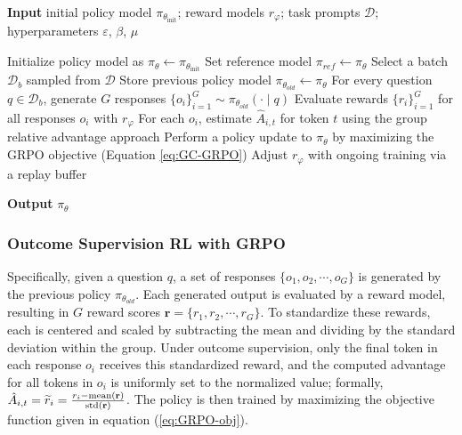 \begin{itemize}[topsep=0pt]
\begin{itemize}[topsep=0pt]
\begin{algorithm}[t]
  \small
  \caption{Iterative Group Relative Policy Optimization}
  \textbf{Input} initial policy model $\pi_{\theta_{\text{init}}}$; reward models $r_\varphi$; task prompts $\mathcal{D}$; 
  hyperparameters $\varepsilon$, $\beta$, $\mu$
  \begin{algorithmic}[1]
    \State Initialize policy model as $\pi_\theta \leftarrow \pi_{\theta_{\text{init}}}$
       \State Set reference model $\pi_{ref} \leftarrow \pi_{\theta}$
      \State Select a batch $\mathcal{D}_b$ sampled from $\mathcal{D}$
      \State Store previous policy model $\pi_{\theta_{old}} \leftarrow \pi_{\theta}$ 
      \State For every question $q \in \mathcal{D}_b$, generate $G$ responses $\{o_i\}_{i=1}^G \sim \pi_{\theta_{old}} (\cdot \mid q)$
      \State Evaluate rewards $\{r_i\}_{i=1}^{G}$ for all responses $o_i$ with $r_\varphi$ 
      \State For each $o_i$, estimate $\hat{A}_{i,t}$ for token $t$ using the group relative advantage approach
        \State Perform a policy update to $\pi_{\theta}$ by maximizing the GRPO objective (Equation \ref{eq:GC-GRPO})
      \EndFor
    \EndFor 
    \State Adjust $r_\varphi$ with ongoing training via a replay buffer
    \EndFor 
  \end{algorithmic}
  \textbf{Output} $\pi_\theta$
  \label{alg:iter-grpo}
\end{algorithm}

\subsubsection{Outcome Supervision RL with GRPO} Specifically, given a question $q$, a set of responses $\{o_1, o_2, \cdots, o_G\}$ is generated by the previous policy $\pi_{\theta_{old}}$. Each generated output is evaluated by a reward model, resulting in $G$ reward scores $\mathbf{r}=\{r_1, r_2, \cdots, r_G\}$. To standardize these rewards, each is centered and scaled by subtracting the mean and dividing by the standard deviation within the group. Under outcome supervision, only the final token in each response $o_i$ receives this standardized reward, and the computed advantage for all tokens in $o_i$ is uniformly set to the normalized value; formally, $\hat{A}_{i, t} = \widetilde{r}_i = \frac{r_i- {\rm mean}(\mathbf{r})}{{\rm std}(\mathbf{r})}$. The policy is then trained by maximizing the objective function given in equation (\ref{eq:GRPO-obj}).


\end{itemize}
\end{itemize}
